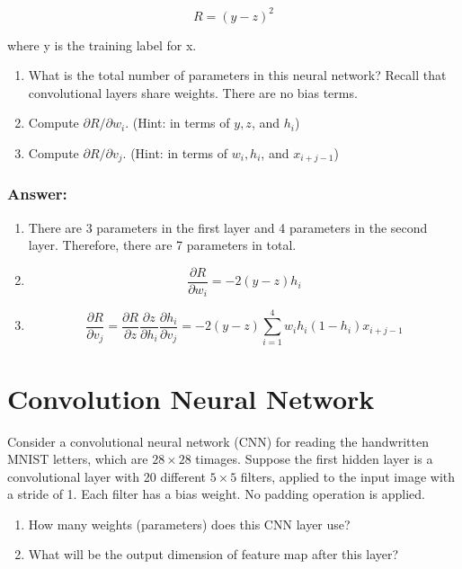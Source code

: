 \documentclass{article}
\begin{document}
\begin{equation}
    R = {(y - z)}^2
\end{equation}

where y is the training label for x.

\begin{enumerate}[label= (\alph*)]
    \item What is the total number of parameters in this neural network? Recall that convolutional layers share weights. There are no bias terms.
    \item Compute $\partial R / \partial w_i$. (Hint: in terms of $y, z$, and $h_i$)
    \item Compute $\partial R / \partial v_j$. (Hint: in terms of $w_i, h_i$, and $x_{i+j-1}$)
\end{enumerate}

\subsubsection*{Answer:}
\begin{enumerate}[label= (\alph*)]
    \item There are 3 parameters in the first layer and 4 parameters in the second layer. Therefore, there are 7 parameters in total.
    \item 
    \begin{equation*}
        \frac{\partial R}{\partial w_i} = -2(y-z)h_i
    \end{equation*}
    \item
    \begin{equation*}
        \frac{\partial R}{\partial v_j} = \frac{\partial R}{\partial z} \frac{\partial z}{\partial h_i} \frac{\partial h_i}{\partial v_j} = -2(y-z)\sum_{i=1}^{4}w_i h_i (1-h_i) x_{i+j-1}
    \end{equation*}
\end{enumerate}

\section{Convolution Neural Network}

Consider a convolutional neural network (CNN) for reading the handwritten MNIST letters, which are $28 \times 28$ timages. Suppose the first hidden layer is a convolutional layer with 20 different $5 \times 5$ filters, applied to the input image with a stride of 1. Each filter has a bias weight. No padding operation is applied.

\begin{enumerate}[label= (\alph*)]
    \item How many weights (parameters) does this CNN layer use?
    \item What will be the output dimension of feature map after this layer?
\end{enumerate}
\end{document}
